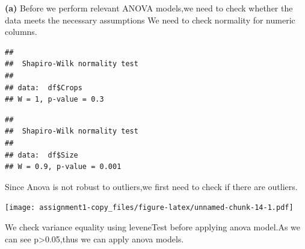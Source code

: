 \documentclass[
]{article}
\newenvironment{Shaded}{\begin{snugshade}}{\end{snugshade}}
\newcommand{\AttributeTok}[1]{\textcolor[rgb]{0.13,0.29,0.53}{#1}}
\newcommand{\ConstantTok}[1]{\textcolor[rgb]{0.56,0.35,0.01}{#1}}
\newcommand{\FunctionTok}[1]{\textcolor[rgb]{0.13,0.29,0.53}{\textbf{#1}}}
\newcommand{\NormalTok}[1]{#1}
\newcommand{\OtherTok}[1]{\textcolor[rgb]{0.56,0.35,0.01}{#1}}
\newcommand{\SpecialCharTok}[1]{\textcolor[rgb]{0.81,0.36,0.00}{\textbf{#1}}}
\newcommand{\StringTok}[1]{\textcolor[rgb]{0.31,0.60,0.02}{#1}}
\begin{document}
\textbf{(a)} Before we perform relevant ANOVA models,we need to check
whether the data meets the necessary assumptions We need to check
normality for numeric columns.

\begin{Shaded}
\end{Shaded}

\begin{verbatim}
## 
##  Shapiro-Wilk normality test
## 
## data:  df$Crops
## W = 1, p-value = 0.3
\end{verbatim}

\begin{Shaded}
\end{Shaded}

\begin{verbatim}
## 
##  Shapiro-Wilk normality test
## 
## data:  df$Size
## W = 0.9, p-value = 0.001
\end{verbatim}

Since Anova is not robust to outliers,we first need to check if there
are outliers.

\begin{Shaded}
\end{Shaded}

\texttt{[image: assignment1-copy\_files/figure-latex/unnamed-chunk-14-1.pdf]}

We check variance equality using leveneTest before applying anova
model.As we can see p\textgreater0.05,thus we can apply anova models.
\end{document}
